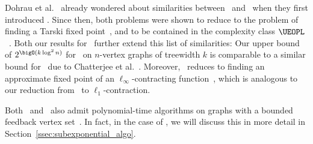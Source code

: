 Dohrau et al.\@~\cite{dohrauARRIVALZeroPlayerGraph2017} already wondered about similarities between \arrival\ and \ssg\ when they first introduced \arrival. Since then, both problems were shown to reduce to the problem of finding a Tarski fixed point~\cite{etessamiTarskiTheoremSupermodular2020, gartnerSubexponentialAlgorithmARRIVAL2021}, and to be contained in the complexity class $\UEOPL$~\cite{fearnleyUniqueEndPotential2020}. Both our results for \arrival\ further extend this list of similarities: Our upper bound of $2^{\bigO(k \log^2 n)}$ for \arrival\ on $n$-vertex graphs of treewidth $k$ is comparable to a similar bound for \ssg\ due to Chatterjee et al.\@~\cite{chatterjeeFasterAlgorithmTurnbased2023}. Moreover, \ssg\ reduces to finding an approximate fixed point of an $\ell_\infty$-contracting function~\cite{condonComplexityStochasticGames1992}, which is analogous to our reduction from \arrival\ to $\ell_1$-contraction. 

Both \arrival\ and \ssg\ also admit polynomial-time algorithms on graphs with a bounded feedback vertex set~\cite{gartnerSubexponentialAlgorithmARRIVAL2021, augerFindingOptimalStrategies2014}. In fact, in the case of \arrival, we will discuss this in more detail in Section~\ref{ssec:subexponential_algo}.